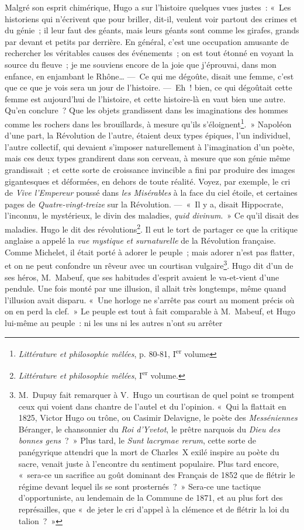 \documentclass[french,twoside]{book} %
\begin{document}
Malgré son esprit chimérique, Hugo a sur l’histoire quelques vues justes : « Les historiens qui n’écrivent que pour briller, dit-il, veulent voir partout des crimes et du génie ; il leur faut des géants, mais leurs géants sont comme les girafes, grands par devant et petits par derrière. En général, c’est une occupation amusante de rechercher les véritables causes des événements ; on est tout étonné en voyant la source du fleuve ; je me souviens encore de la joie que j’éprouvai, dans mon enfance, en enjambant le Rhône… — Ce qui me dégoûte, disait une femme, c’est que ce que je vois sera un jour de l’histoire. — Eh ! bien, ce qui dégoûtait cette femme est aujourd’hui de l’histoire, et cette histoire-là en vaut bien une autre. Qu’en conclure ? Que les objets grandissent dans les imaginations des hommes comme les rochers dans les brouillards, à mesure qu’ils s’éloignent\footnote{\emph{Littérature et philosophie mêlées}, p. 80-81, I\textsuperscript{er} volume}. » Napoléon d’une part, la Révolution de l’autre, étaient deux types épiques, l’un individuel, l’autre collectif, qui devaient s’imposer naturellement à l’imagination d’un poète, mais ces deux types grandirent dans son cerveau, à mesure que son génie même grandissait ; et cette sorte de croissance invincible a fini par produire des images gigantesques et déformées, en dehors de toute réalité. Voyez, par exemple, le cri de \emph{Vive l’Empereur} poussé dans \emph{les Misérables} à la face du ciel étoile, et certaines pages de \emph{Quatre-vingt-treize} sur la Révolution. — « Il y a, disait Hippocrate, l’inconnu, le mystérieux, le divin des maladies, \emph{quid divinum}. » Ce qu’il disait des maladies. Hugo le dit des révolutions\footnote{\emph{Littérature et philosophie mêlées}, I\textsuperscript{er} volume.}. Il eut le tort de partager ce que la critique anglaise a appelé la {\itshape vue mystique et surnaturelle} de la Révolution française. Comme Michelet, il était porté à adorer le peuple ; mais adorer n’est pas flatter, et on ne peut confondre un rêveur avec un courtisan vulgaire\footnote{ M. Dupuy fait remarquer à V. Hugo un courtisan de quel point se trompent ceux qui voient dans chantre de l’autel et du l’opinion. « Qui la flattait en 1825, Victor Hugo ou trône, ou Casimir Delavigne, le poète des \emph{Messéniennes} Béranger, le chansonnier du \emph{Roi d’Yvetot}, le prêtre narquois du \emph{Dieu des bonnes gens} ? » Plus tard, le \emph{Sunt lacrymae rerum}, cette sorte de panégyrique attendri que la mort de Charles X exilé inspire au poète du sacre, venait juste à l’encontre du sentiment populaire. Plus tard encore, « sera-ce un sacrifice au goût dominant des Français de 1852 que de flétrir le régime devant lequel ils se sont prosternés ? » Sera-ce une tactique d’opportuniste, au lendemain de la Commune de 1871, et au plus fort des représailles, que « de jeter le cri d’appel à la clémence et de flétrir la loi du talion ? »}. Hugo dit d’un de ses héros, M. Mabeuf, que ses habitudes d’esprit avaient le va-et-vient d’une pendule. Une fois monté par une illusion, il allait très longtemps, même quand l’illusion avait disparu. « Une horloge ne s’arrête pas court au moment précis où on en perd la clef. » Le peuple est tout à fait comparable à M. Mabeuf, et Hugo lui-même au peuple : ni les uns ni les autres n’ont su arrêter 
\end{document}
